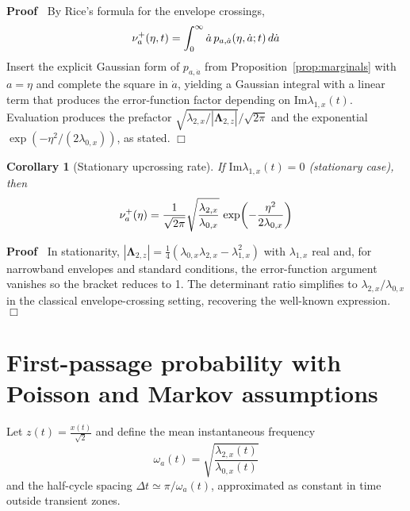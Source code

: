 \documentclass{article}
\newcommand{\tmmathbf}[1]{\ensuremath{\boldsymbol{#1}}}
\newenvironment{proof}{\noindent\textbf{Proof\ }}{\hspace*{\fill}$\Box$\medskip}
\newtheorem{corollary}{Corollary}
\begin{document}
\begin{proof}
  By Rice's formula for the envelope crossings,
  \begin{equation}
    \nu_a^+ (\eta, t) = \int_0^{\infty} \dot{a}  \hspace{0.17em} p_{a,
    \dot{a}} (\eta, \dot{a} ; t)  \hspace{0.17em} d \dot{a}
  \end{equation}
  Insert the explicit Gaussian form of $p_{a, \dot{a}}$ from
  Proposition~\ref{prop:marginals} with $a = \eta$ and complete the square in
  $\dot{a}$, yielding a Gaussian integral with a linear term that produces the
  error-function factor depending on $\mathrm{Im} \lambda_{1, x} (t)$.
  Evaluation produces the prefactor $\sqrt{\lambda_{2, x} /
  |\tmmathbf{\Lambda}_{2, z} |} / \sqrt{2 \pi}$ and the exponential $\exp (-
  \eta^2 / (2 \lambda_{0, x}))$, as stated.
\end{proof}

\begin{corollary}
  [Stationary upcrossing rate]\label{cor:stationary_upcrossing} If
  $\mathrm{Im} \lambda_{1, x} (t) = 0$ (stationary case), then
  \begin{equation}
    \nu_a^+ (\eta) = \frac{1}{\sqrt{2 \pi}}  \sqrt{\frac{\lambda_{2,
    x}}{\lambda_{0, x}}}  \hspace{0.17em} \exp \hspace{-0.17em} \left( -
    \frac{\eta^2}{2 \lambda_{0, x}} \right)
  \end{equation}
\end{corollary}

\begin{proof}
  In stationarity, $|\tmmathbf{\Lambda}_{2, z} | = \tfrac{1}{4} (\lambda_{0,
  x} \lambda_{2, x} - \lambda_{1, x}^2)$ with $\lambda_{1, x}$ real and, for
  narrowband envelopes and standard conditions, the error-function argument
  vanishes so the bracket reduces to 1. The determinant ratio simplifies to
  $\lambda_{2, x} / \lambda_{0, x}$ in the classical envelope-crossing
  setting, recovering the well-known expression.
\end{proof}

\section{First-passage probability with Poisson and Markov assumptions}

Let $z (t) = \frac{x (t)}{\sqrt{2}}$ and define the mean instantaneous
frequency
\begin{equation}
  \label{eq:mean_freq} \omega_a (t) = \sqrt{\frac{\lambda_{2, x}
  (t)}{\lambda_{0, x} (t)}}
\end{equation}
and the half-cycle spacing $\Delta t \simeq \pi / \omega_a (t)$, approximated
as constant in time outside transient zones.
\end{document}
